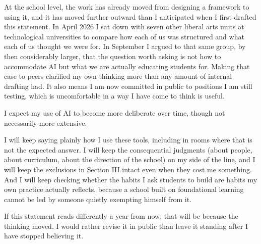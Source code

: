 \documentclass[10pt]{article}
\begin{document}
At the school level, the work has already moved from designing a framework to using it, and it
has moved further outward than I anticipated when I first drafted this statement. In April 2026
I sat down with seven other liberal arts units at technological universities to compare how each
of us was structured and what each of us thought we were for. In September I argued to that same
group, by then considerably larger, that the question worth asking is not how to accommodate AI
but what we are actually educating students for. Making that case to peers clarified my own
thinking more than any amount of internal drafting had. It also means I am now committed in
public to positions I am still testing, which is uncomfortable in a way I have come to think is
useful.

I expect my use of AI to become more deliberate over time, though not necessarily more
extensive.


I will keep saying plainly how I use these tools, including in rooms where that is not the
expected answer. I will keep the consequential judgments (about people, about curriculum, about
the direction of the school) on my side of the line, and I will keep the exclusions in Section
III intact even when they cost me something. And I will keep checking whether the habits I ask
students to build are habits my own practice actually reflects, because a school built on
foundational learning cannot be led by someone quietly exempting himself from it.

If this statement reads differently a year from now, that will be because the thinking moved. I
would rather revise it in public than leave it standing after I have stopped believing it.

\end{document}
